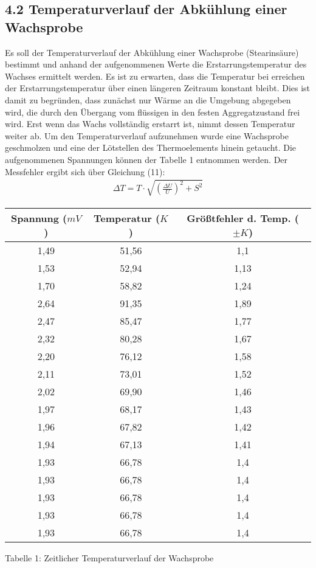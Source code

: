 \documentclass[a4paper]{article}
\begin{document}
\subsection*{4.2 Temperaturverlauf der Abkühlung einer Wachsprobe}
Es soll der Temperaturverlauf der Abkühlung einer Wachsprobe (Stearinsäure) bestimmt und anhand der aufgenommenen Werte die Erstarrungstemperatur des Wachses ermittelt werden. Es ist zu erwarten, dass die Temperatur bei erreichen der Erstarrungstemperatur über einen längeren Zeitraum konstant bleibt. Dies ist damit zu begründen, dass zunächst nur Wärme an die Umgebung abgegeben wird, die durch den Übergang vom flüssigen in den festen Aggregatzustand frei wird. Erst wenn das Wachs vollständig erstarrt ist, nimmt dessen Temperatur weiter ab. Um den Temperaturverlauf aufzunehmen wurde eine Wachsprobe geschmolzen und eine der Lötstellen des Thermoelements hinein getaucht. Die aufgenommenen Spannungen können der Tabelle 1 entnommen werden. Der Messfehler ergibt sich über Gleichung (11):
\begin{align}
\Delta T=T\cdot\sqrt{\left(\frac{\Delta U}{U}\right)^2+S^2}
\end{align}
\begin{center}
\begin{tabular}{ccc}
Spannung ($mV$) & Temperatur ($K$)\footnotemark & Größtfehler d. Temp. ($\pm K$)\\
\hline
1,49 & 51,56 & 1,1\\
1,53 & 52,94 & 1,13\\
1,70 & 58,82 & 1,24\\
2,64 & 91,35 & 1,89\\
2,47 & 85,47 & 1,77\\
2,32 & 80,28 & 1,67\\
2,20 & 76,12 & 1,58\\
2,11 & 73,01 & 1,52\\
2,02 & 69,90 & 1,46\\
1,97 & 68,17 & 1,43\\
1,96 & 67,82 & 1,42\\
1,94 & 67,13 & 1,41\\
1,93 & 66,78 & 1,4\\
1,93 & 66,78 & 1,4\\
1,93 & 66,78 & 1,4\\
1,93 & 66,78 & 1,4\\
1,93 & 66,78 & 1,4\\
\end{tabular}
\end{center}
\begin{flushleft}
\small Tabelle 1: Zeitlicher Temperaturverlauf der Wachsprobe
\end{flushleft}
\end{document}
